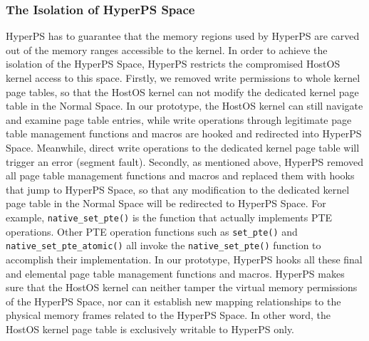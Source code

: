 \subsubsection{The Isolation of HyperPS Space}%
\label{ssub:the_isolation_of_hyperps_space}
HyperPS has to guarantee that the memory regions used by HyperPS are carved out of the memory ranges accessible to the kernel.
In order to achieve the isolation of the HyperPS Space, HyperPS restricts the compromised HostOS kernel access to this space. 
Firstly, we removed write permissions to whole kernel page tables, so that the HostOS kernel can not modify the dedicated kernel page table in the Normal Space. In our prototype, the HostOS kernel can still navigate and examine page table entries, while write operations through legitimate page table management functions and macros are hooked and redirected into HyperPS Space. 
Meanwhile, direct write operations to the dedicated kernel page table will trigger an error (segment fault). 
Secondly, as mentioned above, HyperPS removed all page table management functions and macros and replaced them with hooks that jump to HyperPS Space, so that any modification to the dedicated kernel page table in the Normal Space will be redirected to HyperPS Space. 
For example, \verb|native_set_pte()| is the function that actually implements PTE operations. Other PTE operation functions such as \verb|set_pte()| and \verb|native_set_pte_atomic()| all invoke the \verb|native_set_pte()| function to accomplish their implementation. 
In our prototype, HyperPS hooks all these final and elemental page table management functions and macros.
HyperPS makes sure that the HostOS kernel can neither tamper the virtual memory permissions of the HyperPS Space, nor can it establish new mapping relationships to the physical memory frames related to the HyperPS Space. 
In other word, the HostOS kernel page table is exclusively writable to HyperPS only. 
